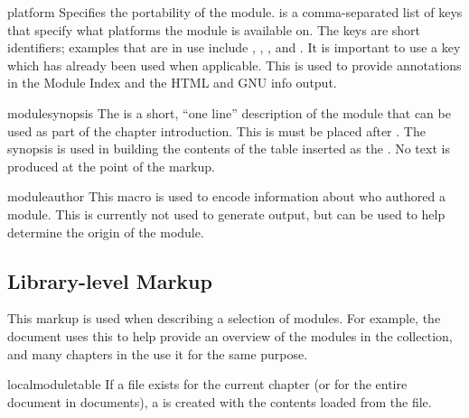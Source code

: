 \documentclass{howto}
\begin{document}
  \begin{macrodesc}{platform}{}
    Specifies the portability of the module.   is a
    comma-separated list of keys that specify what platforms the
    module is available on.  The keys are short identifiers;
    examples that are in use include , ,
    , and .  It is important to use a key
    which has already been used when applicable.  This is used to
    provide annotations in the Module Index and the HTML and GNU info
    output.
  \end{macrodesc}

  \begin{macrodesc}{modulesynopsis}{}
    The  is a short, ``one line'' description of the
    module that can be used as part of the chapter introduction.
    This is must be placed after .
    The synopsis is used in building the contents of the table
    inserted as the .  No text is
    produced at the point of the markup.
  \end{macrodesc}

  \begin{macrodesc}{moduleauthor}{}
    This macro is used to encode information about who authored a
    module.  This is currently not used to generate output, but can be
    used to help determine the origin of the module.
  \end{macrodesc}


  \subsection{Library-level Markup \label{library-markup}}

    This markup is used when describing a selection of modules.  For
    example, the  document uses this to help provide an overview of the
    modules in the collection, and many chapters in the
     use it for
    the same purpose.

  \begin{macrodesc}{localmoduletable}{}
    If a  file exists for the current
    chapter (or for the entire document in  documents), a
     is created with the contents loaded from the
     file.
  \end{macrodesc}
\end{document}
